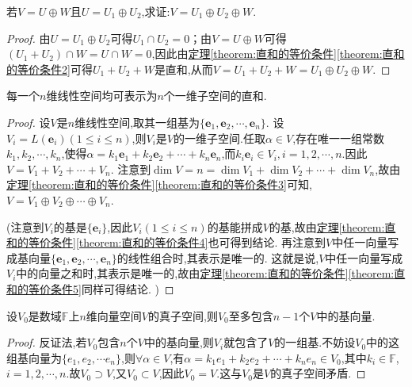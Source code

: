 \documentclass[../../main.tex]{subfiles}
\begin{document}
\begin{proposition}\label{proposition:直和的传递性}
若\(V = U\oplus W\)且\(U = U_1\oplus U_2\),求证:\(V = U_1\oplus U_2\oplus W\). 
\end{proposition}
\begin{proof}
由\(U = U_1\oplus U_2\)可得\(U_1\cap U_2 = 0\)；由\(V = U\oplus W\)可得\((U_1 + U_2)\cap W=U\cap W = 0\),因此由\hyperref[theorem:直和的等价条件2]{定理\ref{theorem:直和的等价条件}\ref{theorem:直和的等价条件2}}可得\(U_1 + U_2+W\)是直和,从而\(V = U_1 + U_2+W = U_1\oplus U_2\oplus W\).
\end{proof}

\begin{proposition}\label{proposition:n维线性空间的一维直和分解}
每一个\(n\)维线性空间均可表示为\(n\)个一维子空间的直和.
\end{proposition}
\begin{proof}
设\(V\)是\(n\)维线性空间,取其一组基为\(\{\boldsymbol{e}_1,\boldsymbol{e}_2,\cdots,\boldsymbol{e}_n\}\). 设\(V_i = L(\boldsymbol{e}_i)(1\leqslant  i\leqslant  n)\),则\(V_i\)是\(V\)的一维子空间.任取$\alpha\in V$,存在唯一一组常数$k_1,k_2,\cdots,k_n$,使得$\alpha =k_1\boldsymbol{e}_1+k_2\boldsymbol{e}_2+\cdots +k_n\boldsymbol{e}_n$,而$k_i\boldsymbol{e}_i\in V_i,i=1,2,\cdots ,n.$因此\(V = V_1 + V_2+\cdots+V_n\). 注意到\(\dim V = n=\dim V_1+\dim V_2+\cdots+\dim V_n\),故由\hyperref[theorem:直和的等价条件3]{定理\ref{theorem:直和的等价条件}\ref{theorem:直和的等价条件3}}可知,\(V = V_1\oplus V_2\oplus\cdots\oplus V_n\). 

(注意到\(V_i\)的基是\(\{\boldsymbol{e}_i\}\),因此\(V_i(1\leqslant  i\leqslant  n)\)的基能拼成\(V\)的基,故由\hyperref[theorem:直和的等价条件4]{定理\ref{theorem:直和的等价条件}\ref{theorem:直和的等价条件4}}也可得到结论. 再注意到\(V\)中任一向量写成基向量\(\{\boldsymbol{e}_1,\boldsymbol{e}_2,\cdots,\boldsymbol{e}_n\}\)的线性组合时,其表示是唯一的. 这就是说,\(V\)中任一向量写成\(V_i\)中的向量之和时,其表示是唯一的,故由\hyperref[theorem:直和的等价条件5]{定理\ref{theorem:直和的等价条件}\ref{theorem:直和的等价条件5}}同样可得结论. )
\end{proof}

\begin{proposition}\label{proposition:真子空间至多包含n-1个基向量}
设\(V_0\)是数域\(\mathbb{F}\)上$n$维向量空间\(V\)的真子空间,则\(V_0\)至多包含$n-1$个$V$中的基向量.
\end{proposition}
\begin{proof}
反证法,若$V_0$包含\(n\)个\(V\)中的基向量,则$V_i$就包含了$V$的一组基.不妨设$V_0$中的这组基向量为$\{e_1,e_2,\cdots e_n\}$,则$\forall \alpha\in V$,有$\alpha =k_1e_1+k_2e_2+\cdots +k_ne_n \in V_0$,其中$k_i\in \mathbb{F}$,$i=1,2,\cdots,n$.故$V_0\supset V$,又$V_0\subset V$,因此$V_0=V$.这与\(V_0\)是\(V\)的真子空间矛盾.
\end{proof}
\end{document}
